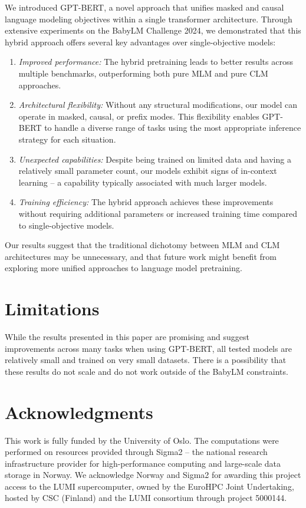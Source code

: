 We introduced GPT-BERT, a novel approach that unifies masked and causal language modeling objectives within a single transformer architecture. Through extensive experiments on the BabyLM Challenge 2024, we demonstrated that this hybrid approach offers several key advantages over single-objective models:
\begin{enumerate}[itemsep=0.15em]
    \item \textit{Improved performance:} The hybrid pretraining leads to better results across multiple benchmarks, outperforming both pure MLM and pure CLM approaches.
    \item \textit{Architectural flexibility:} Without any structural modifications, our model can operate in masked, causal, or prefix modes. This flexibility enables GPT-BERT to handle a diverse range of tasks using the most appropriate inference strategy for each situation.
    \item \textit{Unexpected capabilities:} Despite being trained on limited data and having a relatively small parameter count, our models exhibit signs of in-context learning -- a capability typically associated with much larger models.
    \item \textit{Training efficiency:} The hybrid approach achieves these improvements without requiring additional parameters or increased training time compared to single-objective models.
\end{enumerate}

\noindent
Our results suggest that the traditional dichotomy between MLM and CLM architectures may be unnecessary, and that future work might benefit from exploring more unified approaches to language model pretraining.

\section*{Limitations}

While the results presented in this paper are promising and suggest improvements across many tasks when using GPT-BERT, all tested models are relatively small and trained on very small datasets. There is a possibility that these results do not scale and do not work outside of the BabyLM constraints.

\section*{Acknowledgments}

This work is fully funded by the University of Oslo. The computations were performed on resources provided through Sigma2 – the national research infrastructure provider for high-performance computing and large-scale data storage in Norway. We acknowledge Norway and Sigma2 for awarding this project access to the LUMI supercomputer, owned by the EuroHPC Joint Undertaking, hosted by CSC (Finland) and the LUMI consortium through project 5000144.

\clearpage
\onecolumn

